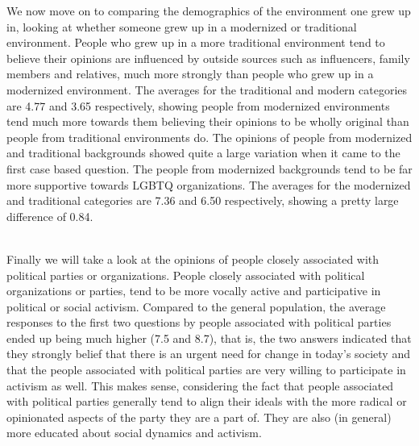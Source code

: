 \documentclass{article}
\begin{document}
We now move on to comparing the demographics of the environment one grew up in, looking at whether someone grew up in a modernized or traditional environment.
People who grew up in a more traditional environment tend to believe their opinions are influenced by outside sources such as influencers, family members and relatives, much more strongly than people who grew up in a modernized environment. The averages for the traditional and modern categories are 4.77 and 3.65 respectively, showing people from modernized environments tend much more towards them believing their opinions to be wholly original than people from traditional environments do.
The opinions of people from modernized and traditional backgrounds showed quite a large variation when it came to the first case based question. The people from modernized backgrounds tend to be far more supportive towards LGBTQ organizations.  The averages for the modernized and traditional categories are 7.36 and 6.50 respectively, showing a pretty large difference of 0.84. \\ \\

Finally we will take a look at the opinions of people closely associated with political parties or organizations.
People closely associated with political organizations or parties, tend to be more vocally active and participative in political or social activism. Compared to the general population, the average responses to the first two questions by people associated with political parties ended up being much higher (7.5 and 8.7), that is, the two answers indicated that they strongly belief that there is an urgent need for change in today’s society and that the people associated with political parties are very willing to participate in activism as well. This makes sense, considering the fact that people associated with political parties generally tend to align their ideals with the more radical or opinionated aspects of the party they are a part of. They are also (in general) more educated about social dynamics and activism. 
\newpage
\end{document}
